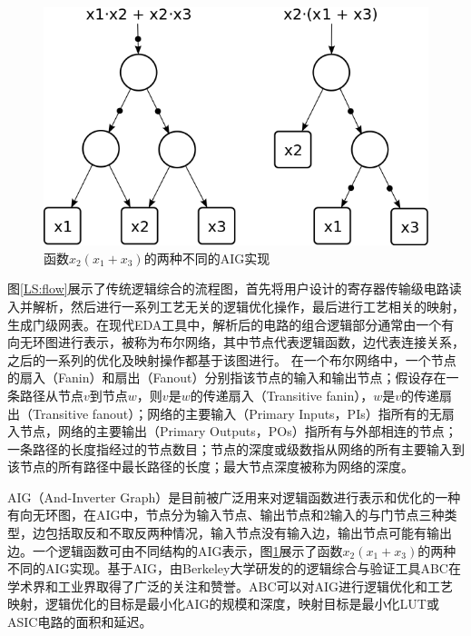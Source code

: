 \begin{figure}[!htbp]
    \centering
    \includegraphics[width=0.6\linewidth]{./figs/LS-two_AIG.png}
    \caption{函数$x_2 (x_1 + x_3)$的两种不同的AIG实现}
    \label{LS:two_AIG}
\end{figure}


图\ref{LS:flow}展示了传统逻辑综合的流程图，首先将用户设计的寄存器传输级电路读入并解析，然后进行一系列工艺无关的逻辑优化操作，最后进行工艺相关的映射，生成门级网表。在现代EDA工具中，解析后的电路的组合逻辑部分通常由一个有向无环图进行表示，被称为布尔网络\cite{FPGA:CLB_Anderson}，其中节点代表逻辑函数，边代表连接关系，之后的一系列的优化及映射操作都基于该图进行。
在一个布尔网络中\cite{LS:exact_rewriting,FPGA:Jason_Cong_1993,LS:Verification_after_synthesis}，一个节点的扇入（Fanin）和扇出（Fanout）分别指该节点的输入和输出节点；假设存在一条路径从节点$v$到节点$w$，则$v$是$w$的传递扇入（Transitive fanin），$w$是$v$的传递扇出（Transitive fanout）；网络的主要输入（Primary Inputs，PIs）指所有的无扇入节点，网络的主要输出（Primary Outputs，POs）指所有与外部相连的节点；一条路径的长度指经过的节点数目；节点的深度或级数指从网络的所有主要输入到该节点的所有路径中最长路径的长度；最大节点深度被称为网络的深度。



AIG（And-Inverter Graph）是目前被广泛用来对逻辑函数进行表示和优化的一种有向无环图\cite{LS:AIG}，在AIG中，节点分为输入节点、输出节点和2输入的与门节点三种类型，边包括取反和不取反两种情况，输入节点没有输入边，输出节点可能有输出边。一个逻辑函数可由不同结构的AIG表示，图\ref{LS:two_AIG}展示了函数$x_2 (x_1 + x_3)$的两种不同的AIG实现。基于AIG，由Berkeley大学研发的的逻辑综合与验证工具ABC\cite{LS:ABC}在学术界和工业界取得了广泛的关注和赞誉。ABC可以对AIG进行逻辑优化和工艺映射，逻辑优化的目标是最小化AIG的规模和深度，映射目标是最小化LUT或ASIC电路的面积和延迟。


